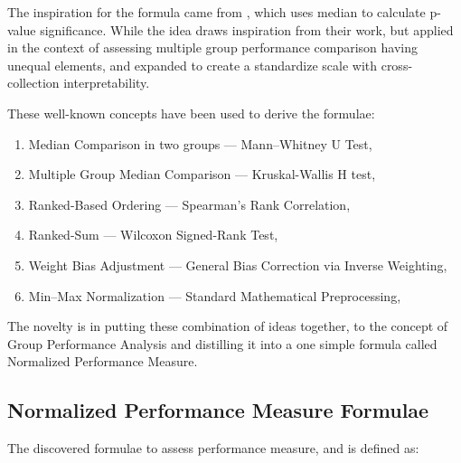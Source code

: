 \documentclass[a4paper,fleqn,review]{cas-sc}
\newcommand{\ldash}{--- }
\begin{document}
The inspiration for the formula came from \cite{mann1947test}, which uses median to calculate p-value significance. While the idea draws inspiration from their work, but applied in the context of assessing multiple group performance comparison having unequal elements, and expanded to create a standardize scale with cross-collection interpretability.

These well-known concepts have been used to derive the formulae:
\begin{enumerate}[i]
\item Median Comparison in two groups \ldash Mann–Whitney U Test, \cite{mann1947test}
\item Multiple Group Median Comparison \ldash Kruskal-Wallis H test, \cite{kruskal1952use}
\item Ranked-Based Ordering \ldash Spearman’s Rank Correlation, \cite{spearman1904proof}
\item Ranked-Sum \ldash Wilcoxon Signed-Rank Test, \cite{wilcoxon1945individual}
\item Weight Bias Adjustment \ldash General Bias Correction via Inverse Weighting, \cite{gelman2007survey}
\item Min–Max Normalization \ldash Standard Mathematical Preprocessing, \cite{han2011data}
\end{enumerate}
The novelty is in putting these combination of ideas together, to the concept of Group Performance Analysis and distilling it into a one simple formula called Normalized Performance Measure.

\subsection{Normalized Performance Measure Formulae} 
The discovered formulae to assess performance measure, and is defined as:
\end{document}
